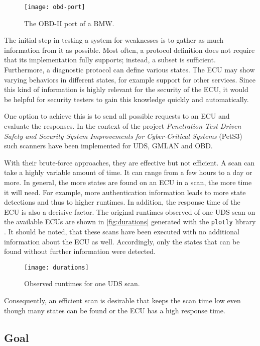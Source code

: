 \begin{figure}[h]
    \centering
    \texttt{[image: obd-port]}
    \caption{The OBD-II port of a BMW.}
    \label{fig:obd-port}
\end{figure}

The initial step in testing a system for weaknesses is to gather as much information from it as possible. Most often, a protocol definition does not require that its implementation fully supports; instead, a subset is sufficient.
Furthermore, a diagnostic protocol can define various states. The ECU may show varying behaviors in different states, for example support for other services. Since this kind of information is highly relevant for the security of the ECU, it would be helpful for security testers to gain this knowledge quickly and automatically.

One option to achieve this is to send all possible requests to an ECU and evaluate the responses. In the context of the project \emph{Penetration Test Driven Safety and Security System Improvements for Cyber-Critical Systems} (PetS3) \cite{pets3} such scanners have been implemented for UDS, GMLAN and OBD.

With their brute-force approaches, they are effective but not efficient. A scan can take a highly variable amount of time. It can range from a few hours to a day or more. In general, the more states are found on an ECU in a scan, the more time it will need. For example, more authentication information leads to more state detections and thus to higher runtimes. In addition, the response time of the ECU is also a decisive factor. The original runtimes observed of one UDS scan on the available ECUs are shown in \autoref{fig:durations} generated with the \texttt{plotly} library \cite{plotly}. It should be noted, that these scans have been executed with no additional information about the ECU as well. Accordingly, only the states that can be found without further information were detected.

\begin{figure}[h]
    \centering
    \texttt{[image: durations]}
    \caption{Observed runtimes for one UDS scan.}
    \label{fig:durations}
\end{figure}

Consequently, an efficient scan is desirable that keeps the scan time low even though many states can be found or the ECU has a high response time.

\subsection{Goal}

